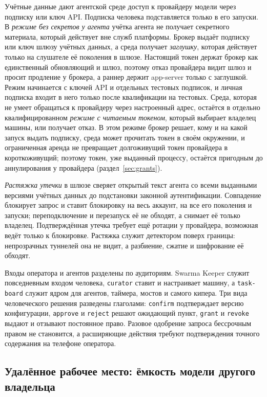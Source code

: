 \documentclass[10pt,a4paper]{article}
\begin{document}
Учётные данные дают агентской среде доступ к провайдеру модели через подписку или ключ API. Подписка человека подставляется только в его запуски. В \emph{режиме без секретов у агента} учётка агента не получает секретного материала, который действует вне служб платформы. Брокер выдаёт подписку или ключ шлюзу учётных данных, а среда получает \emph{заглушку}, которая действует только на слушателе её поколения в шлюзе. Настоящий токен держат брокер как единственный обновляющий и шлюз, поэтому отказ провайдера видит шлюз и просит продление у брокера, а раннер держит app-server только с заглушкой. Режим начинается с ключей API и отдельных тестовых подписок, и личная подписка входит в него только после квалификации на тестовых. Среда, которая не умеет обращаться к провайдеру через настроенный адрес, остаётся в отдельно квалифицированном \emph{режиме с читаемым токеном}, который выбирает владелец машины, или получает отказ. В этом режиме брокер решает, кому и на какой запуск выдать подписку, среда может прочитать токен в своём окружении, и ограниченная аренда не превращает долгоживущий токен провайдера в короткоживущий; поэтому токен, уже выданный процессу, остаётся пригодным до аннулирования у провайдера (раздел~\ref{sec:grants}).

\emph{Растяжка утечки} в шлюзе сверяет открытый текст агента со всеми выданными версиями учётных данных до подстановки законной аутентификации. Совпадение блокирует запрос и ставит блокировку на весь аккаунт, на все его поколения и запуски; переподключение и перезапуск её не обходят, а снимает её только владелец. Подтверждённая утечка требует ещё ротации у провайдера, возможная ведёт только к блокировке. Растяжка служит детектором поверх границы: непрозрачных туннелей она не видит, а разбиение, сжатие и шифрование её обходят.

Входы оператора и агентов разделены по аудиториям. Swarma Keeper служит повседневным входом человека, \texttt{curator} ставит и настраивает машину, а \texttt{task-board} служит ядром для агентов, таймера, мостов и самого кипера. Три вида человеческого решения разведены глаголами: \texttt{confirm} подтверждает версию конфигурации, \texttt{approve} и \texttt{reject} решают ожидающий пункт, \texttt{grant} и \texttt{revoke} выдают и отзывают постоянное право. Разовое одобрение запроса бессрочным правом не становится, а расширяющие действия требуют подтверждения точного содержания на телефоне оператора.

\subsection{Удалённое рабочее место: ёмкость модели другого владельца}
\label{sec:remote}
\end{document}
